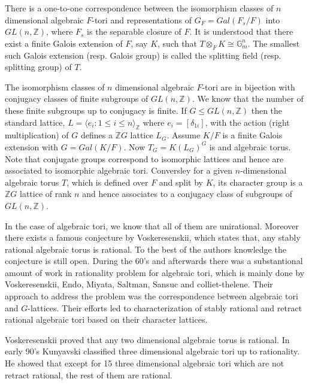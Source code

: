 \documentclass[a4paper, 14pt]{extarticle}
\theoremstyle{plain}
\theoremstyle{definition}
\newcommand{\Z}{\ensuremath{\mathbb{Z}}}
\begin{document}

There is a one-to-one correspondence between the isomorphism classes of 
$n$ dimensional algebraic $F$-tori and representations of $G_F = Gal(F_s/F)$ 
into $GL(n,\Z)$, where $F_s$ is the separable closure of $F$. It is understood 
that there exist a finite Galois extension of $F$, say $K$, such that 
$T \otimes_F K \cong \mathbb{G}_{m}^n$. The smallest such Galois extension 
(resp. Galois group) is called the splitting field (resp. splitting group)
 of $T$.
 
The isomorphism classes of $n$ dimensional algebraic $F$-tori are in bijection 
with conjugacy classes of finite subgroups of $GL(n,\Z)$. We know that the number 
of these finite subgroups up to conjugacy is finite. If $G \leq GL(n,\Z)$ then 
the standard lattice, $L = \langle e_i: 1 \leq i \leq n \rangle_\Z$ where $e_i = [\delta_{1i}]$,
with the action (right multiplication) of $G$ defines a $\Z G$ lattice $L_G$. 
Assume $K/F$ is a finite Galois extension with $G = Gal(K/F)$. Now $T_G = K(L_G)^G$
is and algebraic torus. Note that conjugate groups correspond to isomorphic 
lattices and hence are associated to isomorphic algebraic tori. Conversley for 
a given $n$-dimensional algebraic torus $T$, which is defined over $F$ and split 
by $K$, its character group is a $\Z G$ lattice of rank $n$ and hence associates 
to a conjugacy class of subgroups of $GL(n,\Z)$.  

In the case of algebraic tori, we know that all of them are unirational. 
Moreover there exists a famous conjecture by Voskeresenskii,
which states that, any stably rational algebraic torus is rational. To the 
best of the authors knowledge the conjecture is still open. During the 60's and
afterwards there was a substantional amount of work in rationality problem 
for algebraic tori, which is mainly done by Voskeresenskii, Endo, Miyata, Saltman, 
Sansuc and colliet-thelene. Their approach to address the problem was the
correspondence between algebraic tori and $G$-lattices. Their efforts led to 
characterization of stably rational and retract rational algebraic tori based 
on their character lattices.

Voskeresenskii proved that any two dimensional algebraic torus is rational. 
In early 90's Kunyavski classified three dimensional algebraic tori up to 
rationality. He showed that except for 15 three dimensional algebraic tori 
which are not retract rational, the rest of them are rational.
\end{document}
